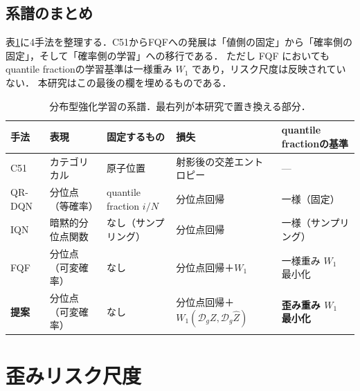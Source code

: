 \documentclass[a4paper,10pt]{jsarticle}
\theoremstyle{definition}
\newcommand{\Wone}{W_1}
\newcommand{\dist}{\mathcal{D}_g}
\begin{document}
\subsection{系譜のまとめ}
表\ref{tab:lineage}に4手法を整理する．C51からFQFへの発展は「値側の固定」から「確率側の固定」，そして「確率側の学習」への移行である．
ただし FQF においてもquantile fractionの学習基準は一様重み $\Wone$ であり，リスク尺度は反映されていない．
本研究はこの最後の欄を埋めるものである．

\begin{table}[htbp]
\centering
\caption{分布型強化学習の系譜．最右列が本研究で置き換える部分．}
\label{tab:lineage}
\small
\setlength{\tabcolsep}{2.5pt}
\begin{tabular}{lllll}
\toprule
手法 & 表現 & 固定するもの & 損失 & quantile fractionの基準\\
\midrule
C51 \cite{bellemare2017c51} & カテゴリカル & 原子位置 & 射影後の交差エントロピー & ---\\
QR-DQN \cite{dabney2018qrdqn} & 分位点（等確率） & quantile fraction $i/N$ & 分位点回帰 & 一様（固定）\\
IQN \cite{dabney2018iqn} & 暗黙的分位点関数 & なし（サンプリング） & 分位点回帰 & 一様（サンプリング）\\
FQF \cite{yang2019fqf} & 分位点（可変確率） & なし & 分位点回帰＋$\Wone$ & 一様重み $\Wone$ 最小化\\
\textbf{提案} & 分位点（可変確率） & なし & 分位点回帰＋$\Wone(\dist Z,\dist\hat Z)$ & \textbf{歪み重み $\Wone$ 最小化}\\
\bottomrule
\end{tabular}
\end{table}

\section{歪みリスク尺度}
\label{sec:drm}
\end{document}
